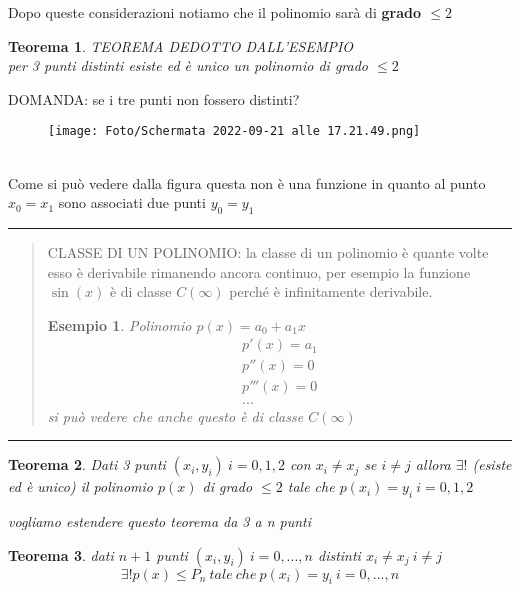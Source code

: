 \documentclass[a4paper, portrait]{book}
\numberwithin{equation}{chapter} %
\newtheorem{example}{Esempio}
\newtheorem{theorem}{Teorema}
\newcommand*\sepline{%
  \begin{center}
    \rule[1ex]{.5\textwidth}{.5pt}
  \end{center}}
\begin{document}
\begin{itemize}
\begin{itemize}
        \end{itemize}
        Dopo queste considerazioni notiamo che il polinomio sarà di \textbf{grado $\leq 2$}
        \begin{theorem}
            \textit{TEOREMA DEDOTTO DALL'ESEMPIO}\\
            per 3 punti distinti esiste ed è unico un polinomio di grado $\leq 2$
        \end{theorem}
        \newpage
        DOMANDA: se i tre punti non fossero distinti?
        \begin{figure}[h!]
            \centering
            \texttt{[image: Foto/Schermata 2022-09-21 alle 17.21.49.png]}
            \caption{}
        \end{figure}
        \\Come si può vedere dalla figura questa non è una funzione in quanto al punto $x_0 = x_1$ sono associati due punti $y_0 = y_1$
        \sepline
        \begin{quotation}
            CLASSE DI UN POLINOMIO: la classe di un polinomio è quante volte esso è derivabile rimanendo ancora continuo, per esempio la funzione $\sin (x)$ è di classe $C(\infty)$ perché è infinitamente derivabile.
            \begin{example}
                Polinomio $p(x) = a_0 + a_1 x$\\
                \begin{gather*}
                    p'(x) = a_1\\
                    p''(x) = 0\\
                    p'''(x) = 0\\
                    ...
                \end{gather*}
                si può vedere che anche questo è di classe $C(\infty)$
            \end{example}
        \end{quotation}
        \sepline
        \begin{theorem}
            Dati 3 punti $(x_i,y_i) \ i = 0,1,2$ con $x_i \neq x_j$ se $i\neq j$ allora $\exists!$ (esiste ed è unico) il polinomio $p(x)$ di grado $\leq 2$ tale che $p(x_i) = y_i \ i = 0,1,2$
        \end{theorem}
        \begin{center}\textit{vogliamo estendere questo teorema da 3 a n punti}\end{center}
        \begin{theorem}
            dati $n+1$ punti $(x_i,y_i) \ i = 0,...,n$ distinti $x_i \neq x_j \ i \neq j$ $$\exists! p(x) \leq P_n \ tale \ che \ p(x_i) = y_i \ i=0,...,n$$

\end{theorem}
\end{itemize}
\end{document}
